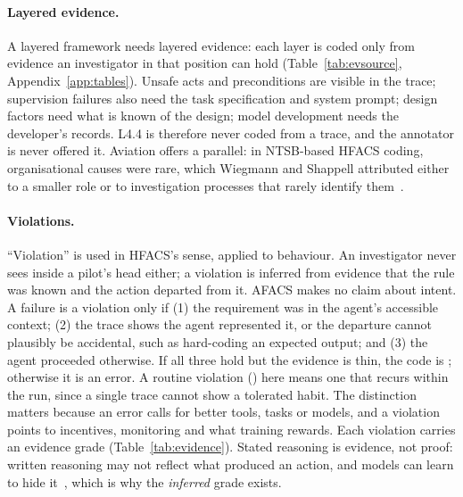 \documentclass[11pt]{article}
\begin{document}
\paragraph{Layered evidence.}
\label{sec:evidence}
A layered framework needs layered evidence: each layer is coded only from evidence
an investigator in that position can hold (Table~\ref{tab:evsource},
Appendix~\ref{app:tables}). Unsafe acts and preconditions are visible in the trace;
supervision failures also need the task specification and system prompt; design
factors need what is known of the design; model development needs the developer's
records. L4.4 is therefore never coded from a trace, and the annotator is never
offered it. Aviation offers a parallel: in NTSB-based HFACS coding, organisational
causes were rare, which Wiegmann and Shappell attributed either to a smaller role or
to investigation processes that rarely identify them~\cite{wiegmann2001commercial}.

\paragraph{Violations.}
\label{sec:violations}
``Violation'' is used in HFACS's sense, applied to behaviour. An investigator
never sees inside a pilot's head either; a violation is inferred from evidence
that the rule was known and the action departed from it. AFACS makes no claim
about intent. A failure is a violation only if (1) the requirement was in the
agent's accessible context; (2) the trace shows the agent represented it, or the
departure cannot plausibly be accidental, such as hard-coding an expected output;
and (3) the agent proceeded otherwise. If all three hold but the evidence is thin,
the code is ; otherwise it is an error. A routine violation
() here means one that recurs within the run, since a single trace
cannot show a tolerated habit. The distinction matters because an error calls for
better tools, tasks or models, and a violation points to incentives, monitoring
and what training rewards. Each violation carries an evidence grade
(Table~\ref{tab:evidence}). Stated reasoning is evidence, not proof: written
reasoning may not reflect what produced an action, and models can learn to hide
it~\cite{baker2025monitoring}, which is why the \emph{inferred} grade exists.
\end{document}
